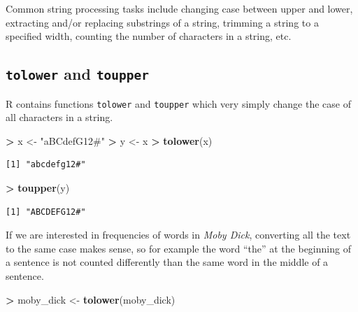 \documentclass[
]{krantz}
\makeatletter
\newenvironment{Shaded}{\begin{snugshade}}{\end{snugshade}}
\newcommand{\KeywordTok}[1]{\textcolor[rgb]{0.27,0.27,0.27}{\textbf{#1}}}
\newcommand{\NormalTok}[1]{#1}
\newcommand{\OperatorTok}[1]{\textcolor[rgb]{0.43,0.43,0.43}{\textbf{#1}}}
\newcommand{\StringTok}[1]{\textcolor[rgb]{0.5,0.5,0.5}{#1}}
\newenvironment{kframe}{%
\medskip{}
\setlength{\fboxsep}{.8em}
 \def\at@end@of@kframe{}%
 \ifinner\ifhmode%
  \def\at@end@of@kframe{\end{minipage}}%
  \begin{minipage}{\columnwidth}%
 \fi\fi%
 \def\FrameCommand##1{\hskip\@totalleftmargin \hskip-\fboxsep
 \colorbox{shadecolor}{##1}\hskip-\fboxsep
     \hskip-\linewidth \hskip-\@totalleftmargin \hskip\columnwidth}%
 \MakeFramed {\advance\hsize-\width
   \@totalleftmargin\z@ \linewidth\hsize
   \@setminipage}}%
 {\par\unskip\endMakeFramed%
 \at@end@of@kframe}
\renewenvironment{Shaded}{\begin{kframe}}{\end{kframe}}
\makeatother
\begin{document}
Common string processing tasks include changing case between upper and lower, extracting and/or replacing substrings of a string, trimming a string to a specified width, counting the number of characters in a string, etc.

\hypertarget{tolower-and-toupper}{%
\subsection{\texorpdfstring{\texttt{tolower} and \texttt{toupper}}{tolower and toupper}}\label{tolower-and-toupper}}

R contains functions \texttt{tolower} and \texttt{toupper} which very simply change the case of all characters in a string.

\begin{Shaded}
\begin{Highlighting}[]
\OperatorTok{\textgreater{}}\StringTok{ }\NormalTok{x \textless{}{-}}\StringTok{ "aBCdefG12\#"}
\OperatorTok{\textgreater{}}\StringTok{ }\NormalTok{y \textless{}{-}}\StringTok{ }\NormalTok{x}
\OperatorTok{\textgreater{}}\StringTok{ }\KeywordTok{tolower}\NormalTok{(x)}
\end{Highlighting}
\end{Shaded}

\begin{verbatim}
[1] "abcdefg12#"
\end{verbatim}

\begin{Shaded}
\begin{Highlighting}[]
\OperatorTok{\textgreater{}}\StringTok{ }\KeywordTok{toupper}\NormalTok{(y)}
\end{Highlighting}
\end{Shaded}

\begin{verbatim}
[1] "ABCDEFG12#"
\end{verbatim}

If we are interested in frequencies of words in \emph{Moby Dick}, converting all the text to the same case makes sense, so for example the word ``the'' at the beginning of a sentence is not counted differently than the same word in the middle of a sentence.

\begin{Shaded}
\begin{Highlighting}[]
\OperatorTok{\textgreater{}}\StringTok{ }\NormalTok{moby\_dick \textless{}{-}}\StringTok{ }\KeywordTok{tolower}\NormalTok{(moby\_dick)}
\end{Highlighting}
\end{Shaded}
\end{document}
